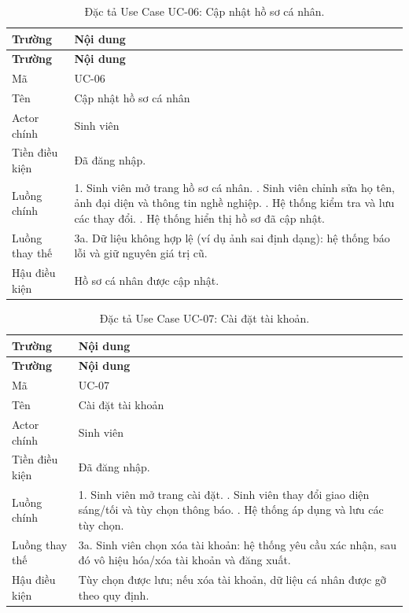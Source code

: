 \begin{longtable}{|L{3.5cm}|L{10cm}|}
\caption{Đặc tả Use Case UC-06: Cập nhật hồ sơ cá nhân.}
\label{tab:uc06} \\
\hline
\textbf{Trường} & \textbf{Nội dung} \\
\hline
\endfirsthead
\hline
\textbf{Trường} & \textbf{Nội dung} \\
\hline
\endhead
Mã & UC-06 \\
\hline
Tên & Cập nhật hồ sơ cá nhân \\
\hline
Actor chính & Sinh viên \\
\hline
Tiền điều kiện & Đã đăng nhập. \\
\hline
Luồng chính & 1. Sinh viên mở trang hồ sơ cá nhân. . Sinh viên chỉnh sửa họ tên, ảnh đại diện và thông tin nghề nghiệp. . Hệ thống kiểm tra và lưu các thay đổi. . Hệ thống hiển thị hồ sơ đã cập nhật. \\
\hline
Luồng thay thế & 3a. Dữ liệu không hợp lệ (ví dụ ảnh sai định dạng): hệ thống báo lỗi và giữ nguyên giá trị cũ. \\
\hline
Hậu điều kiện & Hồ sơ cá nhân được cập nhật. \\
\hline
\end{longtable}

\begin{longtable}{|L{3.5cm}|L{10cm}|}
\caption{Đặc tả Use Case UC-07: Cài đặt tài khoản.}
\label{tab:uc07} \\
\hline
\textbf{Trường} & \textbf{Nội dung} \\
\hline
\endfirsthead
\hline
\textbf{Trường} & \textbf{Nội dung} \\
\hline
\endhead
Mã & UC-07 \\
\hline
Tên & Cài đặt tài khoản \\
\hline
Actor chính & Sinh viên \\
\hline
Tiền điều kiện & Đã đăng nhập. \\
\hline
Luồng chính & 1. Sinh viên mở trang cài đặt. . Sinh viên thay đổi giao diện sáng/tối và tùy chọn thông báo. . Hệ thống áp dụng và lưu các tùy chọn. \\
\hline
Luồng thay thế & 3a. Sinh viên chọn xóa tài khoản: hệ thống yêu cầu xác nhận, sau đó vô hiệu hóa/xóa tài khoản và đăng xuất. \\
\hline
Hậu điều kiện & Tùy chọn được lưu; nếu xóa tài khoản, dữ liệu cá nhân được gỡ theo quy định. \\
\hline
\end{longtable}

